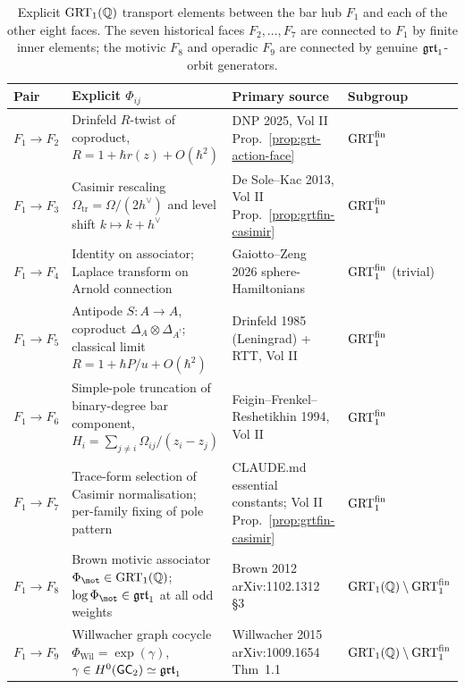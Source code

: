 \begin{table}[h]
\centering
\footnotesize
\begin{tabular}{@{}llll@{}}
\toprule
Pair & Explicit $\Phi_{ij}$ & Primary source & Subgroup \\
\midrule
$F_1 \to F_2$ & Drinfeld $R$-twist of coproduct, $R = 1 + \hbar r(z) + O(\hbar^2)$
  & DNP 2025, Vol II Prop.~\ref{prop:grt-action-face}
  & $\mathrm{GRT}_1^{\mathrm{fin}}$ \\
$F_1 \to F_3$ & Casimir rescaling $\Omega_{\mathrm{tr}} = \Omega/(2h^\vee)$ and level shift $k \mapsto k + h^\vee$
  & De Sole--Kac 2013, Vol II Prop.~\ref{prop:grtfin-casimir}
  & $\mathrm{GRT}_1^{\mathrm{fin}}$ \\
$F_1 \to F_4$ & Identity on associator; Laplace transform on Arnold connection
  & Gaiotto--Zeng 2026 sphere-Hamiltonians
  & $\mathrm{GRT}_1^{\mathrm{fin}}$ (trivial) \\
$F_1 \to F_5$ & Antipode $S: A \to A$, coproduct $\Delta_A \otimes \Delta_{A^!}$; classical limit $R = 1 + \hbar P/u + O(\hbar^2)$
  & Drinfeld 1985 (Leningrad) + RTT, Vol II
  & $\mathrm{GRT}_1^{\mathrm{fin}}$ \\
$F_1 \to F_6$ & Simple-pole truncation of binary-degree bar component, $H_i = \sum_{j \ne i} \Omega_{ij}/(z_i - z_j)$
  & Feigin--Frenkel--Reshetikhin 1994, Vol II
  & $\mathrm{GRT}_1^{\mathrm{fin}}$ \\
$F_1 \to F_7$ & Trace-form selection of Casimir normalisation; per-family fixing of pole pattern
  & CLAUDE.md essential constants; Vol II Prop.~\ref{prop:grtfin-casimir}
  & $\mathrm{GRT}_1^{\mathrm{fin}}$ \\
$F_1 \to F_8$ & Brown motivic associator $\Phi_{\mot} \in \GRT(\QQ)$; $\log \Phi_{\mot} \in \grt$ at all odd weights
  & Brown 2012 arXiv:1102.1312 \S3
  & $\mathrm{GRT}_1(\mathbb{Q}) \setminus \mathrm{GRT}_1^{\mathrm{fin}}$ \\
$F_1 \to F_9$ & Willwacher graph cocycle $\Phi_{\mathrm{Wil}} = \exp(\gamma)$, $\gamma \in H^0(\mathsf{GC}_2) \simeq \mathfrak{grt}_1$
  & Willwacher 2015 arXiv:1009.1654 Thm~1.1
  & $\mathrm{GRT}_1(\mathbb{Q}) \setminus \mathrm{GRT}_1^{\mathrm{fin}}$ \\
\bottomrule
\end{tabular}
\caption{Explicit $\mathrm{GRT}_1(\mathbb{Q})$ transport elements between the bar hub $F_1$
and each of the other eight faces. The seven historical faces $F_2, \dots, F_7$
are connected to $F_1$ by finite inner elements; the motivic $F_8$ and operadic
$F_9$ are connected by genuine $\mathfrak{grt}_1$-orbit generators.}
\label{tab:explicit-Phi-ij}
\end{table}

